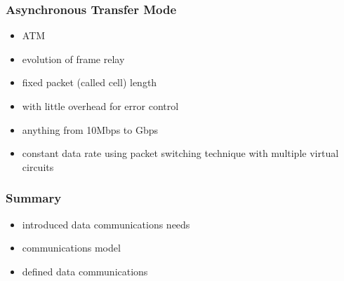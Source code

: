 \documentclass[pdflatex,compress]{beamer}
\begin{document}
\begin{frame}
	\frametitle{Asynchronous Transfer Mode}
	\begin{itemize}
		\item ATM
		\item evolution of frame relay
		\item fixed packet (called cell) length
		\item with little overhead for error control
		\item anything from 10Mbps to Gbps
		\item constant data rate using packet switching technique with multiple virtual circuits
	\end{itemize}
\end{frame}

\begin{frame}
	\frametitle{Summary}
	\begin{itemize}
		\item introduced data communications needs
		\item communications model
		\item defined data communications
	\end{itemize}
\end{frame}
\end{document}
